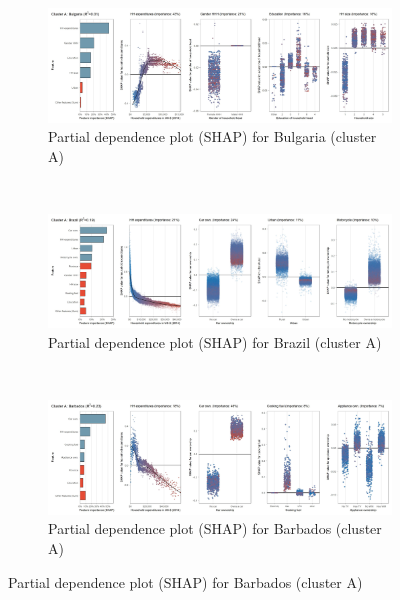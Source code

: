 \begin{figure}[ht!]\ContinuedFloat
    \centering
   \begin{subfigure}[b]{\textwidth}
   \centering
         \caption{Partial dependence plot (SHAP) for Bulgaria (cluster A)}
         \label{fig:5b_BGR}
         \includegraphics[width=\textwidth]{Figure 5b/Figure_5b_BGR}
         \end{subfigure}
    \\
    \vspace{0.5cm}
   \begin{subfigure}[b]{\textwidth}
   \centering
         \caption{Partial dependence plot (SHAP) for Brazil (cluster A)}
         \label{fig:5b_BRA}
         \includegraphics[width=\textwidth]{Figure 5b/Figure_5b_BRA} 
         \end{subfigure}
    \\
    \vspace{0.5cm}
   \begin{subfigure}[b]{\textwidth}
         \centering
         \caption{Partial dependence plot (SHAP) for Barbados (cluster A)}
         \label{fig:5b_BRB}
         \includegraphics[width=\textwidth]{Figure 5b/Figure_5b_BRB}     \end{subfigure}

\end{figure}
